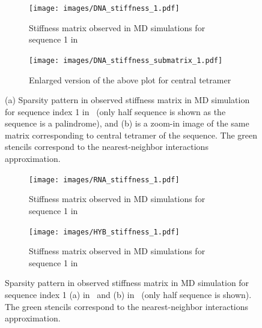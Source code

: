 \begin{figure}
  \begin{subfigure}{15cm}
    \centering\texttt{[image: images/DNA\_stiffness\_1.pdf]}
    \centering\caption{Stiffness matrix observed in MD simulations for sequence 1 in \Lbdna}
  \end{subfigure} 

  \begin{subfigure}{15cm}
    \centering\texttt{[image: images/DNA\_stiffness\_submatrix\_1.pdf]}
    \centering\caption{Enlarged version of the above plot for central tetramer}
  \end{subfigure}
\centering\caption{
(a) Sparsity pattern in observed stiffness matrix in MD simulation for sequence index 1 in \Lbdna \ (only half sequence is shown as the sequence is a palindrome), and (b) is a zoom-in image of the same matrix corresponding to central tetramer of the sequence. 
The green stencils correspond to the nearest-neighbor interactions approximation.
}
\label{c4:fig2_stiffness}
\end{figure}\clearpage
\begin{figure}[H]
  \begin{subfigure}{15cm}
    \centering\texttt{[image: images/RNA\_stiffness\_1.pdf]}
    \centering\caption{Stiffness matrix observed in MD simulations for sequence 1 in \Lbrna}
  \end{subfigure} 

  \begin{subfigure}{15cm}
    \centering\texttt{[image: images/HYB\_stiffness\_1.pdf]}
    \centering\caption{Stiffness matrix observed in MD simulations for sequence 1 in \Lbdrh}
  \end{subfigure}
\centering\caption{
Sparsity pattern in observed stiffness matrix in MD simulation for sequence index 1 (a) in \Lbrna \ and (b) in \Lbdrh \ (only half sequence is shown). 
The green stencils correspond to the nearest-neighbor interactions approximation.
}
\label{c4:fig3_stiffness}
\end{figure}\clearpage


